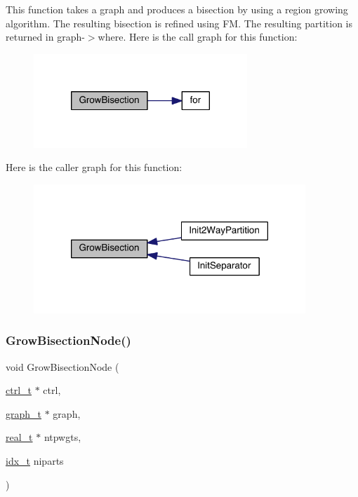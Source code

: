This function takes a graph and produces a bisection by using a region growing algorithm. The resulting bisection is refined using FM. The resulting partition is returned in graph-\/$>$where. Here is the call graph for this function\+:\nopagebreak
\begin{figure}[H]
\begin{center}
\leavevmode
\includegraphics[width=228pt]{a00903_aa565fcd8af582579b67153287a07ea69_cgraph}
\end{center}
\end{figure}
Here is the caller graph for this function\+:\nopagebreak
\begin{figure}[H]
\begin{center}
\leavevmode
\includegraphics[width=290pt]{a00903_aa565fcd8af582579b67153287a07ea69_icgraph}
\end{center}
\end{figure}
\mbox{\label{a00903_a5882ab0f565a5e97581ad5c4847effbc}} 
\subsubsection{\texorpdfstring{Grow\+Bisection\+Node()}{GrowBisectionNode()}}
{\footnotesize\ttfamily void Grow\+Bisection\+Node (\begin{DoxyParamCaption}\item[{\hyperlink{a00742}{ctrl\+\_\+t} $\ast$}]{ctrl,  }\item[{\hyperlink{a00734}{graph\+\_\+t} $\ast$}]{graph,  }\item[{\hyperlink{a00876_a1924a4f6907cc3833213aba1f07fcbe9}{real\+\_\+t} $\ast$}]{ntpwgts,  }\item[{\hyperlink{a00876_aaa5262be3e700770163401acb0150f52}{idx\+\_\+t}}]{niparts }\end{DoxyParamCaption})}

